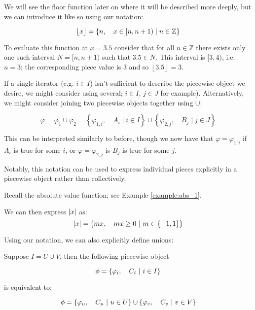 \begin{example}
    We will see the floor function later on where it will be described more deeply, but we can introduce it like so using our notation:

    $$
        \lfloor x\rfloor=\left\{n,\quad x\in[n,n+1)\mid n\in\mathbb{Z}\right\}
    $$

    To evaluate this function at $x=3.5$ consider that for all $n\in\mathbb{Z}$ there exists only one such interval $N=[n,n+1)$ such that $3.5\in N$. This interval is $[3,4)$, i.e. $n=3$; the corresponding piece value is $3$ and so $\left\lfloor 3.5\right\rfloor=3$.
\end{example}

If a single iterator (e.g. $i\in I$) isn't sufficient to describe the piecewise object we desire, we might consider using several; $i\in I$, $j\in J$ for example). Alternatively, we might consider joining two piecewise objects together using $\cup$:

$$
    \varphi = \varphi_1 \cup \varphi_2 = \left\{\varphi_{1,i},\quad A_i\mid i\in I\right\}\cup\left\{\varphi_{2,j},\quad B_j\mid j\in J\right\}
$$

This can be interpreted similarly to before, though we now have that $\varphi=\varphi_{1,i}$ if $A_i$ is true for some $i$, or $\varphi=\varphi_{2,j}$ is $B_j$ is true for some $j$.

Notably, this notation can be used to express individual pieces explicitly in a piecewise object rather than collectively.

\begin{example}
    \label{example:abs_2}

    Recall the absolute value function; see Example \ref{example:abs_1}.

    We can then express $\abs{x}$ as:
    $$
        \abs{x} = \left\{mx,\quad mx\geq 0\ \middle|\ m\in\{-1,1\}\right\}
    $$
\end{example}

\begin{theorem}
    Using our notation, we can also explicitly define unions:

    Suppose $I=U\cup V$, then the following piecewise object

    $$
        \phi=\left\{\varphi_i,\quad C_i\ \middle|\ i\in I\right\}
    $$

    is equivalent to:

    $$
        \phi=\left\{\varphi_u,\quad C_u\ \middle|\ u\in U\right\}\cup\left\{\varphi_v,\quad C_v\ \middle|\ v\in V\right\}
    $$
\end{theorem}

\newpage